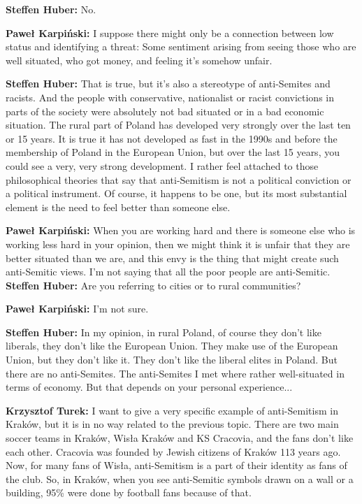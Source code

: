 \textbf{Steffen Huber:} No.\par
\textbf{Paweł Karpiński:} I suppose there might only be a connection between low status and identifying a threat: Some sentiment arising from seeing those who are well situated, who got money, and feeling it's somehow unfair. \par  
\textbf{Steffen Huber:} That is true, but it's also a stereotype of anti-Semites and racists. And the people with conservative, nationalist or racist convictions in parts of the society were absolutely not bad situated or in a bad economic situation. The rural part of Poland has developed very strongly over the last ten or 15 years. It is true it has not developed as fast in the 1990s and before the membership of Poland in the European Union, but over the last 15 years, you could see a very, very strong development. I rather feel attached to those philosophical theories that say that anti-Semitism is not a political conviction or a political instrument. Of course, it happens to be one, but its most substantial element is the need to feel better than someone else. \par 
\textbf{Paweł Karpiński:} When you are working hard and there is someone else who is working less hard in your opinion, then we might think it is unfair that they are better situated than we are, and this envy is the thing that might create such anti-Semitic views. I’m not saying that all the poor people are anti-Semitic.\\  
\textbf{Steffen Huber:} Are you referring to cities or to rural communities? \par
\textbf{Paweł Karpiński:} I'm not sure.\par
\textbf{Steffen Huber:} In my opinion, in rural Poland, of course they don't like liberals, they don't like the European Union. They make use of the European Union, but they don't like it. They don't like the liberal elites in Poland. But there are no anti-Semites. The anti-Semites I met where rather well-situated in terms of economy. But that depends on your personal experience...\par
\textbf{Krzysztof Turek:} I want to give a very specific example of anti-Semitism in Kraków, but it is in no way related to the previous topic. There are two main soccer teams in Kraków, Wisła Kraków and KS Cracovia, and the fans don't like each other. Cracovia was founded by Jewish citizens of Kraków 113 years ago. Now, for many fans of Wisła, anti-Semitism is a part of their identity as fans of the club. So, in Kraków, when you see anti-Semitic symbols drawn on a wall or a building, 95\% were done by football fans because of that. 

